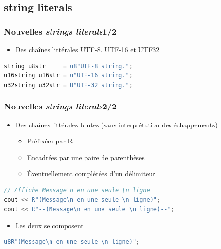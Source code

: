 \documentclass[C++.tex]{subfiles}
\begin{document}
\subsection*{string literals}
\begin{frame}[fragile]
	\frametitle{Nouvelles \textit{strings literals}\titlehfill{}1/2}
	\begin{itemize}
		\item Des chaînes littérales UTF-8, UTF-16 et UTF32
	\end{itemize}

	\begin{lstlisting}[language=C++]
string u8str     = u8"UTF-8 string.";
u16string u16str = u"UTF-16 string.";
u32string u32str = U"UTF-32 string.";\end{lstlisting}
\end{frame}

\begin{frame}[fragile]
	\frametitle{Nouvelles \textit{strings literals}\titlehfill{}2/2}
	\begin{itemize}
		\item Des chaînes littérales brutes (sans interprétation des échappements)


		\begin{itemize}
			\item Préfixées par R
			\item Encadrées par une paire de parenthèses
			\item Éventuellement complétées d'un délimiteur
		\end{itemize}
	\end{itemize}

	\begin{lstlisting}[language=C++]
// Affiche Message\n en une seule \n ligne
cout << R"(Message\n en une seule \n ligne)";
cout << R"--(Message\n en une seule \n ligne)--";\end{lstlisting}

	\begin{itemize}
		\item Les deux se composent
	\end{itemize}

	\begin{lstlisting}[language=C++]
u8R"(Message\n en une seule \n ligne)";\end{lstlisting}
\end{frame}
\end{document}
